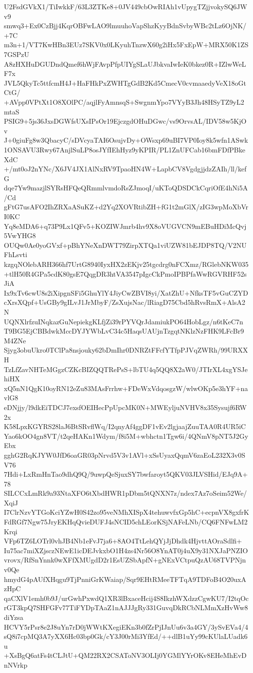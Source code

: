 U2FsdGVkX1/TiIwkkF/63L3ZTKe8+0JV449cbOwRIAh1vUpygTZjjvokySQ6JWv9
smwq3+Ex0CzBjj4KqrOBFwLAO9lmuuhoVapShzKyyBdnSvbyWBc2tLz6OjNK/+7C
m3n+1/VT7KwHBn3EUz7SKV0x0LKyuhTnzwX60g2iHx5FxEpW+MRX50K1ZS7GSPzU
A8zHXHuDGUDndQmef6hWjFAvpPfpUIYgSLaUJbkvaIwIeK0bkez0R+IZlwWeLF7x
JVL5QkyTc5ttfcmH4J+HaFHkPxZWHTgGdB2Kd5CmecV0cvmaaedyVeX18oGtCtG/
+AVpp0VPtXt1O8XOlPC/aqjlFyAmnsqS+SwgnmYpo7VYyB3Jh48HSyTZ9yL2mtaS
PSIG9+5js36JxsDGWfsUXsIPsOr19EjczgdOHuDGwc/vs9OrvsAL/IDV58w5KjOv
J+0giuFg8w3QbacyC/sDVcyaTAI6OsujvDy+OWsxp69uBI7VP0Ioy8k5wfn1ASwk
1ONSAVU3Rwy67AnjlSuLP8osJYfIEhHyz9yKPIR/PL1ZnUFCab16bmFDfPBkeXdC
+/mt0oJ2nYNc/X6JV4JX1AlNxRV9TpaoHN4W+LapbCV8VgdgjjdzZAIh/ll/kefG
dqe7Yw9mazjlSYRsHFQeQRmmlvmdoRsZJmoqI/uKToQDSDCkCqriOfE4hNi5A/Cd
gFtG7usAFO2IhZRXaASuKZ+d2Yq2XOVRtibZH+fG1t2mGlX/zIG3wpMoXbVrI0KC
Yq8eMDA6+q73P9Lx1QFv5+KOZIWJmrb4hv9X8oVUGVCN9mEBuHDiMcQvj5VwYHG8
OUQw0Ae0yoGVxf+pBhYNeXnDWT79ZirpXTQa1viUZW81bEJDP8TQ/V2NUFhLsvti
kzgqNOlebARH366hf7UrtG8940IyxHX2zEKjv25tgcdrg0nFCXmz/RGlebNKW035
+tlH50R4GPa5cdK80gsE7QqgDR3htVA3547pIgcCkPmoIPBPfaWwRGVRHF52sJiA
Ix9xTv6cwU8s2iXipgnSFi5GhuYlY4JiyCwZBVI8yi/XatZhU+NfksTF5vGuCZYD
cXrsXQpf+UsGBy9gILvJ1JrMbyF/ZsXujsNac/lRiagD75Cbd5hRvsRmX+AlsA2N
UQNXlrfzuINqkazGuNepiekgKLfjZi39rPYVQrJdamiukPO64HobLgz/n6tKeC7n
T9BG5EjCBBdwkMccDYJYWbLvC34c5HaqsUAUjnTzgqtNKlzNzFHK9LFcBr9M4ZNe
Sjyg3obuUkro0TClPa8nsjouky62bDmIhr0DNRZtFFcfYTfpPJVqZWRh/99URXXH
TzLfZavNHTeMGgzCZKcBIZQQTRePsS+lbTU4q5QQ8X2aW0/JTIrXL4xgYSJehiHX
xQ5nN1QgK10oyRN12eZu83MAsFrrhw+FDeWxVdqosgzW/wlwOKp5e3hYF+navlG8
eDNjjy/l9dkEiTDCJ7exsfOEIHecPpUpcMK0N+MWEyljuNVHV8x35Sysujf6RW2x
K58LpxKGYRS28laJ6BtSRvflWq/I2qnyAf4ggDF1vEv2lgjaajZuuTAA0R4UR5iC
Yao6kOO4gn8VT/t2qeHAKn1Wdym/f8i5M+wbhctn1Tgw6i/4QNmV8pNT5J2GyEbx
gghG2RqKJYW0JfD6oaGR03pNrvd5V3v1AVl+xSsUyaxQqmV6zaEoL232X3v0SV76
7Hdi+LxRmHnTao9dhQ9Q/9uwpQeSjuxSY7bwfaroyt5QKV03JLVSHid/EJq9A+78
SILCCxLmRk9a93NtaXFO6tXbdHWR1pDbm5tQNXN7z/ndex7Az7oSeim52We/XqiJ
I7ClrNzvYTGoKciYZwH0S42zo95veNMhXISpX4tehuwvfxGp5hC+ecpnVX8gxfrK
FdRGf7Ngw75JryEKHqQvieDUFJ4sNCID5chLEorKSjNAFeLNb/CQ6FNFwLM2Krqi
VFp6TZ6LOTrl0vhJB4Nb1eFvJ7ja6+8AO4TtLehQYjJjDhdk4HjvttAOraSdlfi+
Iu75ac7miXZjsczNEwE1icDEJvkxbO1H4zs4Nr56O8YnAT0j4uX9y31NXJaPNZIO
vrovx/RfSnYnnk0wXFfXMUgdD2r1EsUZSbApfN+gNExVCtpuQzAU68TVPNjnv0Qe
hmydG4pAUfXHqgu9TjPnniGrKWaiap/Sqr9EHtRMeeTFTqA9TDFoB4O20uxAzHpC
qaCXlV1emh0b9J/urGwhPxwdQ1XR3lBxaceHcij4S8IkzhWXdzzCgwKU7/I2tqOc
rGT3kpQ7SHFGFv77TiFYDpTAaZ1nAJJJgRy331GuvqDkRCbNLMmXzHvWw8diYzsa
HCVY5rPsr8e2J8uYn7rD0jWWtKXegiEKn3b0fZrPjIJnUu6v3a4GY/3ySvEVa4/4
sQ8i7cpMQ3A7yXX6Hc03bp0Gk/cY3J00rMi3YfEd/++dlB1uYy99cKUlaLUadk6u
+XsBgQ6atFs4tCLJtU+QM22RX2CSAToNV3OLIj0YGMlYYrOKv8EHeMhEvDnNVrkp
